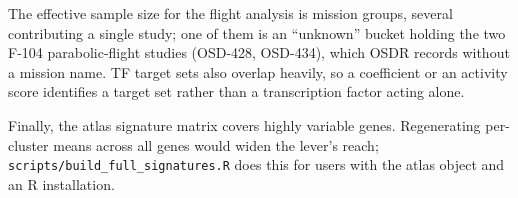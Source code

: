 The effective sample size for the flight analysis is \NumMissionObservations{} mission
groups, several contributing a single study; one of them is an ``unknown'' bucket holding
the two F-104 parabolic-flight studies (OSD-428, OSD-434), which OSDR records without a
mission name. TF target sets also overlap heavily, so a coefficient
or an activity score identifies a target set rather than a transcription factor acting
alone.

Finally, the atlas signature matrix covers \NumAtlasSignatureGenes{} highly variable
genes. Regenerating per-cluster means across all genes would widen the lever's reach;
\texttt{scripts/build\_full\_signatures.R} does this for users with the atlas object and
an R installation.
